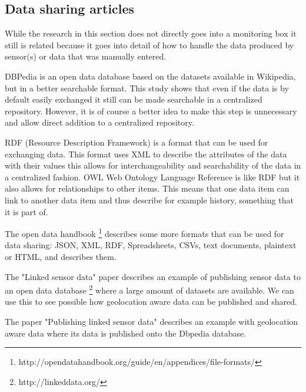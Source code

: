 \documentclass[conference]{IEEEtran}
\begin{document}
\subsection{Data sharing articles}
While the research in this section does not directly goes into a monitoring box it still is related because it goes into detail of how to handle the data produced by sensor(s) or data that was manually entered.
\par
DBPedia \cite{auer2007dbpedia}  is an open data database based on the datasets available in Wikipedia, but in a better searchable format. This study shows that even if the data is by default easily exchanged it still can be made searchable in a centralized repository. However, it is of course a better idea to make this step is unnecessary and allow direct addition to a centralized repository.
\par
RDF (Resource Description Framework) is a format that can be used for exchanging data. \cite{lassila1998resource}  This format uses XML to describe the attributes of the data with their values this allows for interchangeability and searchability of the data in a centralized fashion.
OWL Web Ontology Language Reference \cite{mcguinness2004owl}  is like RDF but it also allows for relationships to other items. This means that one data item can link to another data item and thus describe for example history, something that it is part of.
\par
The open data handbook \footnote{http://opendatahandbook.org/guide/en/appendices/file-formats/} describes some more formats that can be used for data sharing: JSON, XML, RDF, Spreadsheets, CSVs, text documents, plaintext or HTML, and describes them.
\par
The "Linked sensor data" paper describes an example of publishing sensor data to an open data database \footnote{http://linkeddata.org/} where a large amount of datasets are available. We can use this to see possible how geolocation aware data can be published and shared.
\par
The paper "Publishing linked sensor data" describes an example with geolocation aware data where its data is published onto the Dbpedia database. \cite{barnaghi2010publishing} 
\end{document}

